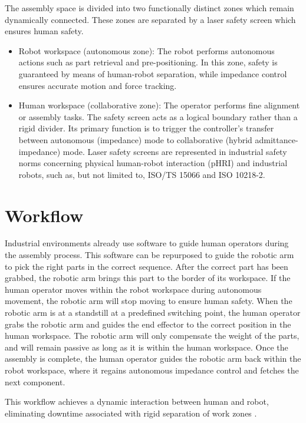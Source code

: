 \documentclass[11pt,a4paper]{article}
\begin{document}
The assembly space is divided into two functionally distinct zones which remain dynamically connected. These zones are separated by a laser safety screen which ensures human safety.

\begin{itemize}
    \item Robot workspace (autonomous zone): The robot performs autonomous actions such as part retrieval and pre-positioning. In this zone, safety is guaranteed by means of human-robot separation, while impedance control ensures accurate motion and force tracking.

    \item Human workspace (collaborative zone): The operator performs fine alignment or assembly tasks. The safety screen acts as a logical boundary rather than a rigid divider. Its primary function is to trigger the controller's transfer between autonomous (impedance) mode to collaborative (hybrid admittance-impedance) mode. Laser safety screens are represented in industrial safety norms concerning physical human-robot interaction (pHRI) and industrial robots, such as, but not limited to, ISO/TS 15066 and ISO 10218-2.
    
\end{itemize}

\section*{Workflow}
Industrial environments already use software to guide human operators during the assembly process. This software can be repurposed to guide the robotic arm to pick the right parts in the correct sequence. After the correct part has been grabbed, the robotic arm brings this part to the border of its workspace. If the human operator moves within the robot workspace during autonomous movement, the robotic arm will stop moving to ensure human safety. When the robotic arm is at a standstill at a predefined switching point, the human operator grabs the robotic arm and guides the end effector to the correct position in the human workspace. The robotic arm will only compensate the weight of the parts, and will remain passive as long as it is within the human workspace. Once the assembly is complete, the human operator guides the robotic arm back within the robot workspace, where it regains autonomous impedance control and fetches the next component.

This workflow achieves a dynamic interaction between human and robot, eliminating downtime associated with rigid separation of work zones \cite{Praxie_Cobot}\cite{ScienceDirect_Cobot}.
\end{document}
